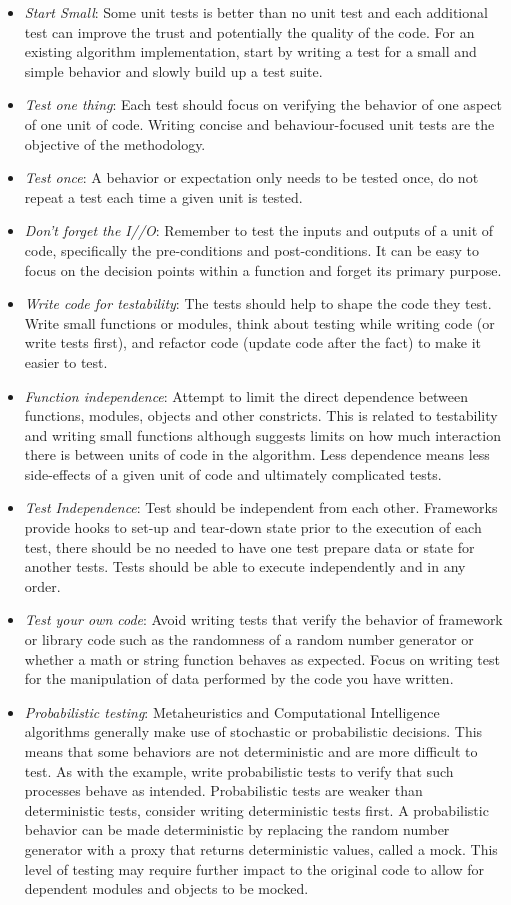\documentclass[a4paper, 11pt]{article}
\begin{document}
\begin{itemize}
 	\item \emph{Start Small}: Some unit tests is better than no unit test and each additional test can improve the trust and potentially the quality of the code. For an existing algorithm implementation, start by writing a test for a small and simple behavior and slowly build up a test suite.
  \item \emph{Test one thing}: Each test should focus on verifying the behavior of one aspect of one unit of code. Writing concise and behaviour-focused unit tests are the objective of the methodology.
  \item \emph{Test once}: A behavior or expectation only needs to be tested once, do not repeat a test each time a given unit is tested.
  \item \emph{Don't forget the I//O}: Remember to test the inputs and outputs of a unit of code, specifically the pre-conditions and post-conditions. It can be easy to focus on the decision points within a function and forget its primary purpose.
	\item \emph{Write code for testability}: The tests should help to shape the code they test. Write small functions or modules, think about testing while writing code (or write tests first), and refactor code (update code after the fact) to make it easier to test.
	\item \emph{Function independence}: Attempt to limit the direct dependence between functions, modules, objects and other constricts. This is related to testability and writing small functions although suggests limits on how much interaction there is between units of code in the algorithm. Less dependence means less side-effects of a given unit of code and ultimately complicated tests.
  \item \emph{Test Independence}: Test should be independent from each other. Frameworks provide hooks to set-up and tear-down state prior to the execution of each test, there should be no needed to have one test prepare data or state for another tests. Tests should be able to execute independently and in any order.
	\item \emph{Test your own code}: Avoid writing tests that verify the behavior of framework or library code such as the randomness of a random number generator or whether a math or string function behaves as expected. Focus on writing test for the manipulation of data performed by the code you have written.
	\item \emph{Probabilistic testing}: Metaheuristics and Computational Intelligence algorithms generally make use of stochastic or probabilistic decisions. This means that some behaviors are not deterministic and are more difficult to test. As with the example, write probabilistic tests to verify that such processes behave as intended. Probabilistic tests are weaker than deterministic tests, consider writing deterministic tests first. A probabilistic behavior can be made deterministic by replacing the random number generator with a proxy that returns deterministic values, called a mock. This level of testing may require further impact to the original code to allow for dependent modules and objects to be mocked.

\end{itemize}
\end{document}
